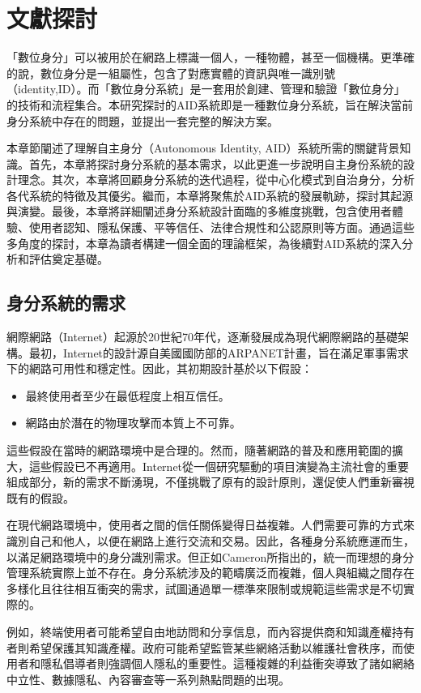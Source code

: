 
\chapter{文獻探討}
「數位身分」可以被用於在網路上標識一個人，一種物體，甚至一個機構。更準確的說，數位身分是一組屬性，包含了對應實體的資訊與唯一識別號（identity,ID）。而「數位身分系統」是一套用於創建、管理和驗證「數位身分」的技術和流程集合。本研究探討的AID系統即是一種數位身分系統，旨在解決當前身分系統中存在的問題，並提出一套完整的解決方案。

本章節闡述了理解自主身分（Autonomous Identity, AID）系統所需的關鍵背景知識。首先，本章將探討身分系統的基本需求，以此更進一步說明自主身份系統的設計理念。其次，本章將回顧身分系統的迭代過程，從中心化模式到自治身分，分析各代系統的特徵及其優劣。繼而，本章將聚焦於AID系統的發展軌跡，探討其起源與演變。最後，本章將詳細闡述身分系統設計面臨的多維度挑戰，包含使用者體驗、使用者認知、隱私保護、平等信任、法律合規性和公認原則等方面。通過這些多角度的探討，本章為讀者構建一個全面的理論框架，為後續對AID系統的深入分析和評估奠定基礎。
\section{身分系統的需求}
網際網路（Internet）起源於20世紀70年代，逐漸發展成為現代網際網路的基礎架構。最初，Internet的設計源自美國國防部的ARPANET計畫，旨在滿足軍事需求下的網路可用性和穩定性。因此，其初期設計基於以下假設\cite{Pekka2010HIP}：
\begin{itemize}
  \item 最終使用者至少在最低程度上相互信任。
  \item 網路由於潛在的物理攻擊而本質上不可靠。
\end{itemize}
這些假設在當時的網路環境中是合理的。然而，隨著網路的普及和應用範圍的擴大，這些假設已不再適用\cite{tomorrowinternet}。Internet從一個研究驅動的項目演變為主流社會的重要組成部分，新的需求不斷湧現，不僅挑戰了原有的設計原則，還促使人們重新審視既有的假設。

在現代網路環境中，使用者之間的信任關係變得日益複雜。人們需要可靠的方式來識別自己和他人，以便在網路上進行交流和交易。因此，各種身分系統應運而生，以滿足網路環境中的身分識別需求。但正如Cameron\cite{cameron2005laws}所指出的，統一而理想的身分管理系統實際上並不存在。身分系統涉及的範疇廣泛而複雜，個人與組織之間存在多樣化且往往相互衝突的需求，試圖通過單一標準來限制或規範這些需求是不切實際的。

例如，終端使用者可能希望自由地訪問和分享信息，而內容提供商和知識產權持有者則希望保護其知識產權。政府可能希望監管某些網絡活動以維護社會秩序，而使用者和隱私倡導者則強調個人隱私的重要性。這種複雜的利益衝突導致了諸如網絡中立性、數據隱私、內容審查等一系列熱點問題的出現\cite{Wu2003NetworkNeutrality}。


